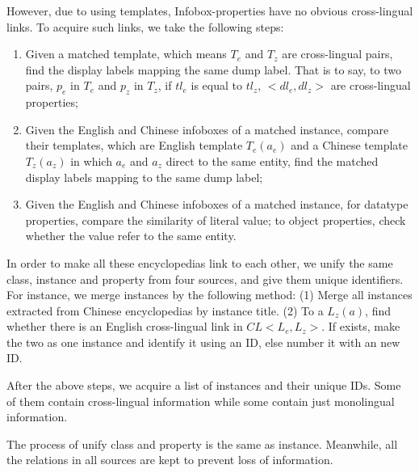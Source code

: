 \documentclass[runningheads,a4paper]{llncs}
\begin{document}
However, due to using templates, Infobox-properties have no obvious cross-lingual links. To acquire such links, we take the following steps: 
\begin{enumerate}[1)]
    \item Given a matched template, which means $T_{e}$ and $T_{z}$ are cross-lingual pairs, find the display labels mapping the same dump label. That is to say, to two pairs, $p_{e}$ in $T_{e}$ and $p_{z}$ in $T_{z}$, if $tl_{e}$ is equal to $tl_{z}$, $<dl_{e},dl_{z}>$ are cross-lingual properties;
    \item Given the English and Chinese infoboxes of a matched instance, compare their templates, which are English template $T_{e}(a_{e})$ and a Chinese template $T_{z}(a_{z})$ in which $a_{e}$ and $a_{z}$ direct to the same entity, find the matched display labels mapping to the same dump label; 
    \item Given the English and Chinese infoboxes of a matched instance, for datatype properties, compare the similarity of literal value; to object properties, check whether the value refer to the same entity. 
\end{enumerate}

In order to make all these encyclopedias link to each other, we unify the same class, instance and property from four sources, and give them unique identifiers. For instance, we merge instances by the following method: (1) Merge all instances extracted from Chinese encyclopedias by instance title. (2) To a $L_{z}(a)$, find whether there is an English cross-lingual link in $CL<L_{e}, L_{z}>$. If exists, make the two as one instance and identify it using an ID, else number it with an new ID.

After the above steps, we acquire a list of instances and their unique IDs. Some of them contain cross-lingual information while some contain just monolingual information.

The process of unify class and property is the same as instance. Meanwhile, all the relations in all sources are kept to prevent loss of information.
\end{document}
